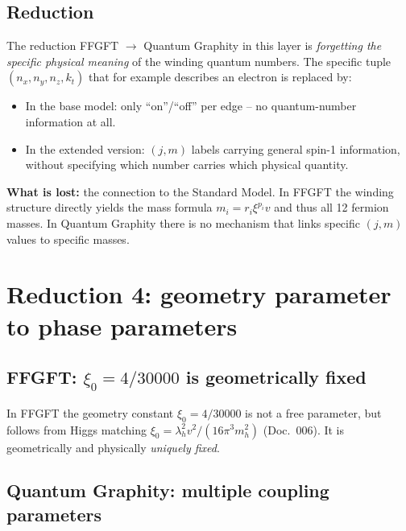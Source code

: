 \subsection{Reduction}

The reduction FFGFT $\to$ Quantum Graphity in this layer is
\emph{forgetting the specific physical meaning} of the winding
quantum numbers. The specific tuple $(n_x, n_y, n_z, k_t)$ that for
example describes an electron is replaced by:
\begin{itemize}[leftmargin=2em,itemsep=2pt,topsep=2pt]
  \item In the base model: only \enquote{on}/\enquote{off} per edge --
        no quantum-number information at all.
  \item In the extended version: $(j, m)$ labels carrying general
        spin-1 information, without specifying which number carries
        which physical quantity.
\end{itemize}

\textbf{What is lost:} the connection to the Standard Model. In
FFGFT the winding structure directly yields the mass formula
$m_i = r_i \xi^{p_i} v$ and thus all 12 fermion masses. In Quantum
Graphity there is no mechanism that links specific $(j, m)$ values
to specific masses.

\section{Reduction 4: geometry parameter to phase parameters}

\subsection{\texorpdfstring{FFGFT: $\xi_0 = 4/30000$ is geometrically fixed}{FFGFT: xi0 = 4/30000 is geometrically fixed}}

In FFGFT the geometry constant $\xi_0 = 4/30000$ is not a free
parameter, but follows from Higgs matching
$\xi_0 = \lambda_h^2 v^2/(16\pi^3 m_h^2)$ (Doc.~006). It is
geometrically and physically \emph{uniquely fixed}.

\subsection{Quantum Graphity: multiple coupling parameters}


